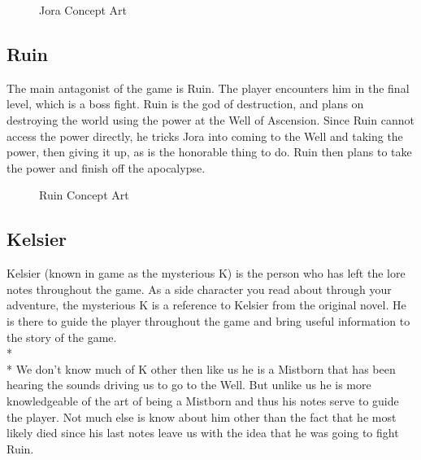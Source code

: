\documentclass{article}
\begin{document}
\begin{figure}[!htb]
  \caption {Jora Concept Art}
  \end{figure}


\subsection{Ruin}
The main antagonist of the game is Ruin. The player encounters him in the final level, which is a boss fight. Ruin is the god of destruction, and plans on destroying the world using the power at the Well of Ascension. Since Ruin cannot access the power directly, he tricks Jora into coming to the Well and taking the power, then giving it up, as is the honorable thing to do. Ruin then plans to take the power and finish off the apocalypse.

\begin{figure}[!htb]
  \caption {Ruin Concept Art}
  \end{figure}

\subsection{Kelsier}
Kelsier (known in game as the mysterious K) is the person who has left the lore notes throughout the game.
As a side character you read about through your adventure, the mysterious K is a reference to Kelsier from the original novel. He is there to guide the player throughout the game and bring useful information to the story of the game.
\\*\\*
We don’t know much of K other then like us he is a Mistborn that has been hearing the sounds driving us to go to the Well. But unlike us he is more knowledgeable of the art of being a Mistborn and thus his notes serve to guide the player. Not much else is know about him other than the fact that he most likely died since his last notes leave us with the idea that he was going to fight Ruin.
\end{document}
